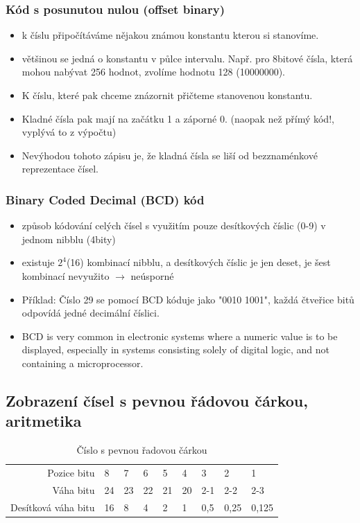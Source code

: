 \documentclass[10pt,a4paper]{article}
\begin{document}
\subsubsection{Kód s posunutou nulou (offset binary)}
\begin{itemize}
\item k číslu připočítáváme nějakou známou konstantu kterou si stanovíme.
\item většinou se jedná o konstantu v půlce intervalu. Např. pro 8bitové čísla, která mohou nabývat 256 hodnot, zvolíme hodnotu 128 (10000000).
\item K číslu, které pak chceme znázornit přičteme stanovenou konstantu.
\item Kladné čísla pak mají na začátku 1 a záporné 0. (naopak než přímý kód!, vyplývá to z výpočtu)
\item Nevýhodou tohoto zápisu je, že kladná čísla se liší od bezznaménkové reprezentace čísel.
\end{itemize}

\subsubsection{Binary Coded Decimal (BCD) kód}
\begin{itemize}
\item způsob kódování celých čísel s využitím pouze desítkových číslic (0-9) v jednom nibblu (4bity)
\item existuje $2^4$(16) kombinací nibblu, a desítkových číslic je jen deset, je šest kombinací nevyužito $\rightarrow$ neúsporné
\item Příklad: Číslo 29 se pomocí BCD kóduje jako "0010 1001", každá čtveřice bitů odpovídá jedné decimální číslici.
\item BCD is very common in electronic systems where a numeric value is to be displayed, especially in systems consisting solely of digital logic, and not containing a microprocessor.
\end{itemize}
\subsection{Zobrazení čísel s pevnou řádovou čárkou, aritmetika}
\begin{table}[ht]
\centering
\begin{tabular}{r|llllllll}
\hline
Pozice bitu         & 8  & 7  & 6  & 5  & 4  & 3   & 2    & 1     \\
Váha bitu           & 24 & 23 & 22 & 21 & 20 & 2-1 & 2-2  & 2-3   \\
Desítková váha bitu & 16 & 8  & 4  & 2  & 1  & 0,5 & 0,25 & 0,125 \\ 
\hline
\end{tabular}
\caption{Číslo s pevnou řadovou čárkou}
\label{tab:fixedPoint}
\end{table}
\end{document}
